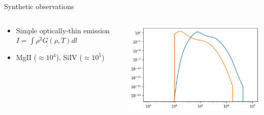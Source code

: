 \documentclass[10pt,aspectratio=169,usenames,dvipsnames]{beamer}
\begin{document}
\begin{frame}{Synthetic observations}
\begin{columns}
\begin{column}{0.4\textwidth}
\begin{itemize}
    \item Simple optically-thin emission $I= \int \rho^2 G(\rho,T) dl$
    \item MgII ($\approx 10^4$), SiIV ($\approx 10^5$)
\end{itemize}
\end{column}
\begin{column}{0.6\textwidth}
\includegraphics[width=0.95\linewidth]{2023Dundee/Figures/intenstestplot_lineprofile.png}
\end{column}
\end{columns}
\end{frame}
\end{document}

